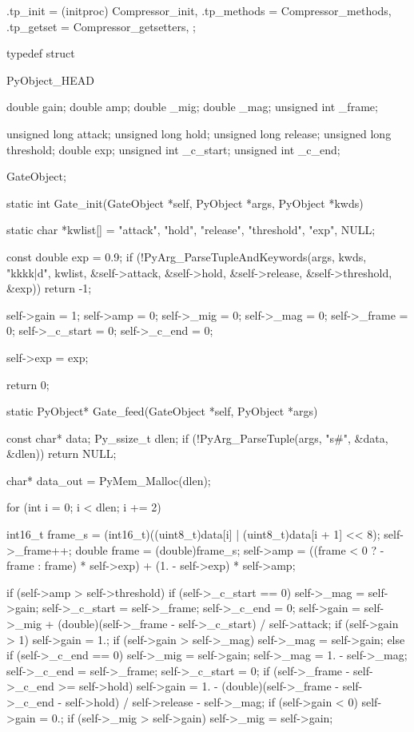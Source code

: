 \begin{pythoncode}
{    .tp_init = (initproc) Compressor_init,
    .tp_methods = Compressor_methods,
    .tp_getset = Compressor_getsetters,
};

typedef struct {
    PyObject_HEAD

    double gain;
    double amp;
    double _mig;
    double _mag;
    unsigned int _frame;

    unsigned long attack;
    unsigned long hold;
    unsigned long release;
    unsigned long threshold;
    double exp;
    unsigned int _c_start;
    unsigned int _c_end;
} GateObject;

static int Gate_init(GateObject *self, PyObject *args, PyObject *kwds) {
    static char *kwlist[] = {"attack", "hold", "release", "threshold", "exp", NULL};

    const double exp = 0.9;
    if (!PyArg_ParseTupleAndKeywords(args, kwds, "kkkk|d", kwlist,
                                     &self->attack, &self->hold,
                                     &self->release, &self->threshold,
                                     &exp))
        return -1;

    self->gain = 1;
    self->amp = 0;
    self->_mig = 0;
    self->_mag = 0;
    self->_frame = 0;
    self->_c_start = 0;
    self->_c_end = 0;

    self->exp = exp;

    return 0;
}

static PyObject* Gate_feed(GateObject *self, PyObject *args) {
    const char* data;
    Py_ssize_t dlen;
    if (!PyArg_ParseTuple(args, "s#", &data, &dlen))
        return NULL;

    char* data_out = PyMem_Malloc(dlen);

    for (int i = 0; i < dlen; i += 2) {
        int16_t frame_s = (int16_t)((uint8_t)data[i] | (uint8_t)data[i + 1] << 8);
        self->_frame++;
        double frame = (double)frame_s;
        self->amp = ((frame < 0 ? -frame : frame) * self->exp) + (1. - self->exp) * self->amp;

        if (self->amp > self->threshold) {
            if (self->_c_start == 0) {
                self->_mag = self->gain;
                self->_c_start = self->_frame;
                self->_c_end = 0;
            }
            self->gain = self->_mig + (double)(self->_frame - self->_c_start) / self->attack;
            if (self->gain > 1)
                self->gain = 1.;
            if (self->gain > self->_mag)
                self->_mag = self->gain;
        } else {
            if (self->_c_end == 0) {
                self->_mig = self->gain;
                self->_mag = 1. - self->_mag;
                self->_c_end = self->_frame;
                self->_c_start = 0;
            }
            if (self->_frame - self->_c_end >= self->hold) {
                self->gain = 1. - (double)(self->_frame - self->_c_end - self->hold) / self->release - self->_mag;
                if (self->gain < 0)
                    self->gain = 0.;
            }
            if (self->_mig > self->gain)
                self->_mig = self->gain;
        }

}}
\end{pythoncode}
